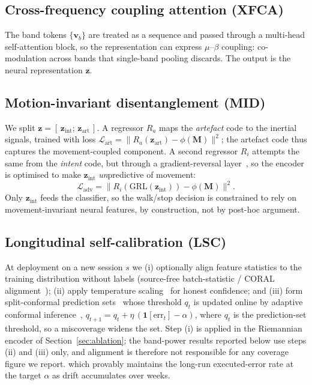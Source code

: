 \documentclass[conference]{IEEEtran}
\begin{document}
\subsection{Cross-frequency coupling attention (XFCA)}
The band tokens $\{\mathbf{v}_b\}$ are treated as a sequence and passed through a
multi-head self-attention block, so the representation can express $\mu$--$\beta$
coupling: co-modulation across bands that single-band pooling discards. The output
is the neural representation $\mathbf{z}$.

\subsection{Motion-invariant disentanglement (MID)}
We split $\mathbf{z}=[\,\mathbf{z}_{\mathrm{int}};\,\mathbf{z}_{\mathrm{art}}\,]$. A
regressor $R_a$ maps the \emph{artefact} code to the inertial signals, trained with
loss $\mathcal{L}_{\mathrm{art}}=\lVert R_a(\mathbf{z}_{\mathrm{art}})-\phi(\mathbf{M})\rVert^2$;
the artefact code thus captures the movement-coupled component. A second regressor
$R_i$ attempts the same from the \emph{intent} code, but through a gradient-reversal
layer~\cite{ganin2016}, so the encoder is optimised to make $\mathbf{z}_{\mathrm{int}}$
\emph{un}predictive of movement:
\begin{equation}
\mathcal{L}_{\mathrm{adv}}=\lVert R_i(\mathrm{GRL}(\mathbf{z}_{\mathrm{int}}))-\phi(\mathbf{M})\rVert^2 .
\end{equation}
Only $\mathbf{z}_{\mathrm{int}}$ feeds the classifier, so the walk/stop decision is
constrained to rely on movement-invariant neural features, by construction, not by
post-hoc argument.

\subsection{Longitudinal self-calibration (LSC)}
At deployment on a new session $s$ we (i) optionally align feature statistics to the
training distribution without labels (source-free batch-statistic / CORAL
alignment~\cite{sun2016}); (ii) apply temperature scaling~\cite{guo2017} for honest
confidence; and (iii) form split-conformal prediction sets~\cite{angelopoulos2023}
whose threshold $q_t$ is updated online by adaptive conformal
inference~\cite{gibbs2021},
$q_{t+1}=q_t+\eta\,(\mathbf{1}[\text{err}_t]-\alpha)$,
where $q_t$ is the prediction-set threshold, so a miscoverage widens the set. Step
(i) is applied in the Riemannian encoder of Section~\ref{sec:ablation}; the
band-power results reported below use steps (ii) and (iii) only, and alignment is
therefore not responsible for any coverage figure we report.
which provably maintains the long-run executed-error rate at the target $\alpha$ as
drift accumulates over weeks.
\end{document}
